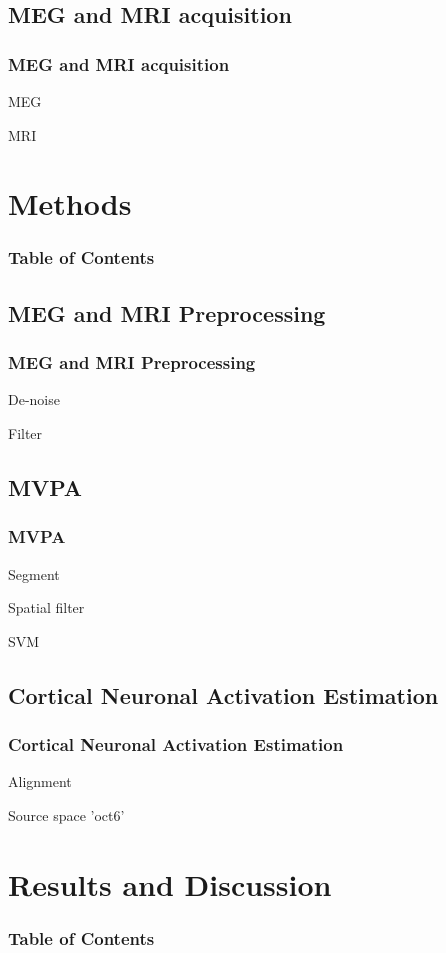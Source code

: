 \documentclass{beamer}
\begin{document}
\subsection{MEG and MRI acquisition}
\begin{frame}
    \frametitle{MEG and MRI acquisition}
    MEG

    MRI

\end{frame}

\section{Methods}
\begin{frame}[plain]
    \frametitle{Table of Contents}
\end{frame}

\subsection{MEG and MRI Preprocessing}
\begin{frame}
    \frametitle{MEG and MRI Preprocessing}
    De-noise

    Filter
\end{frame}

\subsection{MVPA}
\begin{frame}
    \frametitle{MVPA}
    Segment

    Spatial filter

    SVM
\end{frame}

\subsection{Cortical Neuronal Activation Estimation}
\begin{frame}
    \frametitle{Cortical Neuronal Activation Estimation}
    Alignment

    Source space 'oct6'
\end{frame}

\section{Results and Discussion}
\begin{frame}[plain]
    \frametitle{Table of Contents}
\end{frame}
\end{document}
